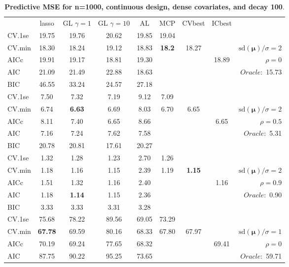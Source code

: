 \begin{table}\vspace{-.5cm}
\caption[l]{ { \bf Predictive MSE for n=1000, continuous design, 
dense covariates, and  decay  100}.}
\vspace{-.5cm}
\footnotesize{}
\begin{center}
\begin{tabular}{l*{7}{c}|r}
 & lasso & GL $\gamma=1$ & GL $\gamma=10$ & AL & MCP  & CVbest & ICbest  \\
\cline{1-9}
CV.1se & 19.75 & 19.76 & 20.62 & 19.85 & 19.04 & & & \\
CV.min & 18.30 & 18.24 & 19.12 & 18.83 & {\bf 18.2} & 18.27 & & $\mathrm{sd}(\mathbf{\mu})/\sigma=2$ \\
AICc & 19.91 & 19.17 & 18.81 & 19.30 & & & 18.89 &  $\rho=0$ \\
AIC & 21.09 & 21.49 & 22.88 & 18.63 & & & &  \multirow{2}{*}{$Oracle: $ 15.73} \\
BIC & 46.55 & 33.24 & 24.57 & 27.18 & & & &  \\
 \hline 
CV.1se & 7.50 & 7.32 & 7.19 & 9.12 & 7.09 & & & \\
CV.min & 6.74 & {\bf 6.63} & 6.69 & 8.03 & 6.70 & 6.65 & & $\mathrm{sd}(\mathbf{\mu})/\sigma=2$ \\
AICc & 8.11 & 7.40 & 6.65 & 8.66 & & & 6.65 &  $\rho=0.5$ \\
AIC & 7.16 & 7.24 & 7.62 & 7.58 & & & &  \multirow{2}{*}{$Oracle: $ 5.31} \\
BIC & 20.78 & 20.81 & 17.61 & 20.27 & & & &  \\
 \hline 
CV.1se & 1.32 & 1.28 & 1.23 & 2.70 & 1.26 & & & \\
CV.min & 1.18 & 1.16 & 1.15 & 2.39 & 1.19 & {\bf 1.15} & & $\mathrm{sd}(\mathbf{\mu})/\sigma=2$ \\
AICc & 1.51 & 1.32 & 1.16 & 2.40 & & & 1.16 &  $\rho=0.9$ \\
AIC & 1.18 & {\bf 1.14} & 1.15 & 2.36 & & & &  \multirow{2}{*}{$Oracle: $ 0.90} \\
BIC & 3.33 & 3.33 & 3.31 & 3.28 & & & &  \\
 \hline 
CV.1se & 75.68 & 78.22 & 89.56 & 69.05 & 73.29 & & & \\
CV.min & {\bf 67.78} & 69.59 & 80.16 & 68.33 & 67.80 & 67.97 & & $\mathrm{sd}(\mathbf{\mu})/\sigma=1$ \\
AICc & 70.19 & 69.24 & 77.65 & 68.32 & & & 69.41 &  $\rho=0$ \\
AIC & 87.75 & 90.22 & 95.25 & 73.65 & & & &  \multirow{2}{*}{$Oracle: $ 59.71} \\

\end{tabular}
\end{center}
\end{table}
